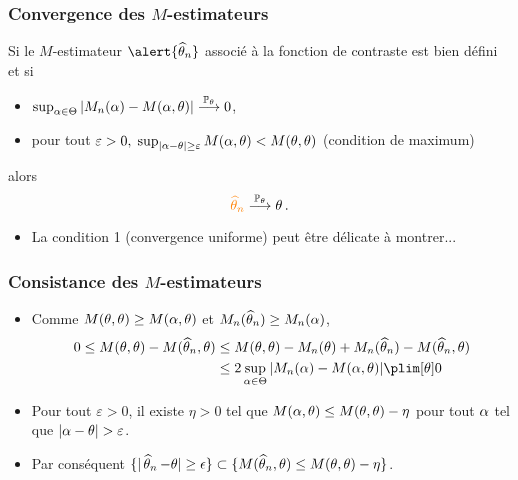 \begin{frame}
\frametitle{Convergence des $M$-estimateurs}
\begin{prop}
Si le $M$-estimateur $\alert{\est}$ associé à la fonction de contraste est bien défini et si
\begin{itemize}
\item $\sup_{\alpha \in \Theta}|M_n(\alpha)-M(\alpha,\theta)| \stackrel{\operatorname{{\mathbb P}}_\theta}{\longrightarrow} 0$,
\item pour tout $\varepsilon >0, \;\sup_{|\alpha-\theta| \geq \varepsilon}M(\alpha,\theta)<M(\theta,\theta)$ \alert{(condition de maximum)}
\end{itemize}
alors
$$
\tco{\est} \stackrel{\PP_\truetheta}{\longrightarrow} \truetheta \eqsp.
$$
\end{prop}
\begin{itemize}
\item La condition 1 (convergence uniforme) peut être délicate à montrer...
\end{itemize}
\end{frame}

\begin{frame}
\frametitle{Consistance des $M$-estimateurs}
\begin{itemize}
\item Comme $M(\theta,\theta) \geq M(\alpha,\theta)$ et $M_n(\operatorname{\widehat \theta_{\mathnormal{n}}}) \geq M_n(\alpha)$,
\begin{align*}
0 \leq M(\truetheta,\truetheta) - M(\est,\truetheta)
&\leq M(\truetheta,\truetheta) - M_n(\truetheta) + M_n(\est) - M(\est,\truetheta) \\
&\leq 2 \sup_{\curtheta \in \Theta} |M_n(\curtheta)- M(\curtheta,\truetheta)| \plim[\truetheta] 0
\end{align*}
\pause \item Pour tout $\varepsilon > 0$, il existe $\eta > 0$ tel que $M(\alpha,\theta) \leq M(\theta,\theta)-\eta$ pour tout $\alpha$ tel que $|\alpha-\theta| > \varepsilon$.
\pause \item Par conséquent $\{ |\operatorname{\widehat \theta_{\mathnormal{n}}} - \theta| \geq \epsilon \} \subset \{ M(\operatorname{\widehat \theta_{\mathnormal{n}}},\theta) \leq M(\theta,\theta)-\eta\}$.
\end{itemize}
\end{frame}

